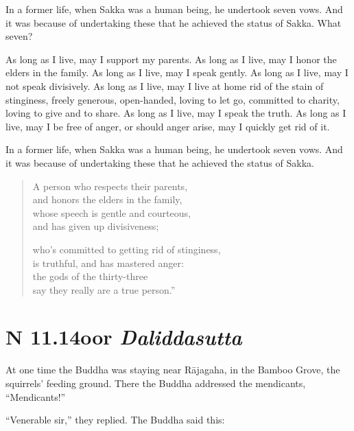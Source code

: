 \documentclass[12pt,openany]{book}%
\newcommand*{\suttatitleacronym}[1]{\smaller[2]{#1}\vspace*{.3em}}
\newcommand*{\suttatitletranslation}[1]{\linebreak{#1}}
\newcommand*{\suttatitleroot}[1]{\linebreak\smaller[2]\itshape{#1}}
\newcommand*{\tocacronym}[1]{\hspace*{-3.3em}{#1}\quad}
\newcommand*{\toctranslation}[1]{#1}
\newcommand*{\tocroot}[1]{(\textit{#1})}
\begin{document}
In a former life, when Sakka was a human being, he undertook seven vows. And it was because of undertaking these that he achieved the status of Sakka. What seven? 

As long as I live, may I support my parents. As long as I live, may I honor the elders in the family. As long as I live, may I speak gently. As long as I live, may I not speak divisively. As long as I live, may I live at home rid of the stain of stinginess, freely generous, open-handed, loving to let go, committed to charity, loving to give and to share. As long as I live, may I speak the truth. As long as I live, may I be free of anger, or should anger arise, may I quickly get rid of it. 

In a former life, when Sakka was a human being, he undertook seven vows. And it was because of undertaking these that he achieved the status of Sakka. 

\begin{verse}%
A person who respects their parents, \\
and honors the elders in the family, \\
whose speech is gentle and courteous, \\
and has given up divisiveness; 

who’s committed to getting rid of stinginess, \\
is truthful, and has mastered anger: \\
the gods of the thirty-three \\
say they really are a true person.” 

%
\end{verse}

%
\section*{{\suttatitleacronym SN 11.14}{\suttatitletranslation Poor }{\suttatitleroot Daliddasutta}}
\addcontentsline{toc}{section}{\tocacronym{SN 11.14} \toctranslation{Poor } \tocroot{Daliddasutta}}

At one time the Buddha was staying near \textsanskrit{Rājagaha}, in the Bamboo Grove, the squirrels’ feeding ground. There the Buddha addressed the mendicants, “Mendicants!” 

“Venerable sir,” they replied. The Buddha said this: 
\end{document}
